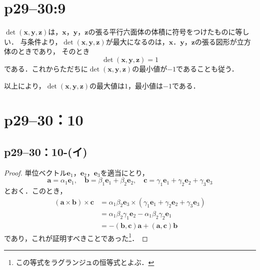 \documentclass[a4paper,10pt,fleqn]{ltjsarticle}
\begin{document}
\section*{p29--30:9}

\begin{tleftbar}
    $ \det (\bm{x},\bm{y},\bm{z})$は，$\bm{x}$，$\bm{y}$，$\bm{z}$の張る平行六面体の体積に符号をつけたものに等しい．
    与条件より，$\det (\bm{x},\bm{y},\bm{z})$が最大になるのは，$\bm{x}$．$\bm{y}$，$\bm{z}$の張る図形が立方体のときであり，
    そのとき
    \[
        \det (\bm{x},\bm{y},\bm{z}) =1
    \]
    である．これからただちに$\det (\bm{x},\bm{y},\bm{z})$の最小値が$-1$であることも従う．

    以上により，$\det (\bm{x},\bm{y},\bm{z})$の最大値は$1$，最小値は$-1$である．
\end{tleftbar}

\section*{p29--30：10}

\subsection*{p29--30：10-(イ)}

\begin{tleftbar}
    \begin{proof}
        単位ベクトル$\bm{e}_1$，$\bm{e}_2$，$\bm{e}_3$を適当にとり，
        \[
            \bm{a} = \alpha_1 \bm{e}_1,\quad \bm{b} = \beta_1 \bm{e}_1+\beta_2 \bm{e}_2,\quad \bm{c}= \gamma_1 \bm{e}_1 + \gamma_2 \bm{e}_2 + \gamma_3 \bm{e}_3
        \]
        とおく．このとき，
        \begin{align*}
            (\bm{a} \times \bm{b}) \times \bm{c} & = \alpha_1 \beta_2 \bm{e}_3 \times (\gamma_1 \bm{e}_1 + \gamma_2 \bm{e}_2 + \gamma_3 \bm{e}_3) \\
                                                 & = \alpha_1 \beta_2 \gamma_1 \bm{e}_2 - \alpha_1 \beta_2 \gamma_2 \bm{e}_1                      \\
                                                 & = -(\bm{b},\bm{c})\bm{a}+(\bm{a},\bm{c}) \bm{b}
        \end{align*}
        であり，これが証明すべきことであった\footnote{この等式をラグランジュの恒等式とよぶ．}．
    \end{proof}
\end{tleftbar}
\end{document}
